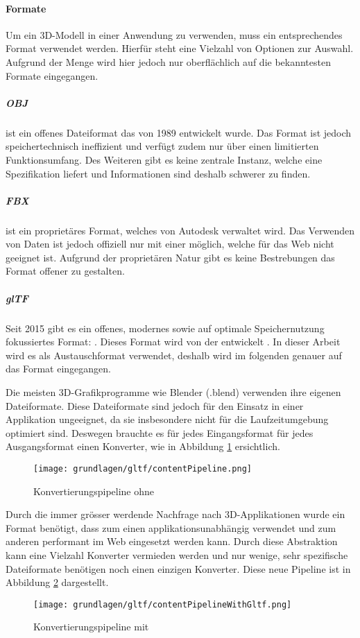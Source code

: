 \paragraph{Formate}
Um ein 3D-Modell in einer Anwendung zu verwenden, muss ein entsprechendes Format verwendet werden. Hierfür steht eine Vielzahl von Optionen zur Auswahl. Aufgrund der Menge wird hier jedoch nur oberflächlich auf die bekanntesten Formate eingegangen.

\subparagraph{OBJ}
 ist ein offenes Dateiformat das von  1989 entwickelt wurde. Das Format ist jedoch speichertechnisch ineffizient und verfügt zudem nur über einen limitierten Funktionsumfang. Des Weiteren gibt es keine zentrale Instanz, welche eine Spezifikation liefert und Informationen sind deshalb schwerer zu finden. \cite{objSpec}

\subparagraph{FBX}
 ist ein proprietäres Format, welches von Autodesk verwaltet wird. Das Verwenden von  Daten ist jedoch offiziell nur mit einer  möglich, welche für das Web nicht geeignet ist. Aufgrund der proprietären Natur gibt es keine Bestrebungen das Format offener zu gestalten.

\subparagraph{glTF}
Seit 2015 gibt es ein offenes, modernes sowie auf optimale Speichernutzung fokussiertes Format: . Dieses Format wird von der  entwickelt \cite{gltf1Spec}. In dieser Arbeit wird es als Austauschformat verwendet, deshalb wird im folgenden genauer auf das Format eingegangen.

Die meisten 3D-Grafikprogramme wie Blender (.blend) verwenden ihre eigenen Dateiformate. Diese Dateiformate sind jedoch für den Einsatz in einer Applikation ungeeignet, da sie insbesondere nicht für die Laufzeitumgebung optimiert sind. Deswegen brauchte es für jedes Eingangsformat für jedes Ausgangsformat einen Konverter, wie in Abbildung \ref{fig:contentPipelineWithoutGltf} ersichtlich.

\begin{figure}[H]
  \centering
  \texttt{[image: grundlagen/gltf/contentPipeline.png]}
  \caption{Konvertierungspipeline ohne  \cite{gltfTutorialIntro}}
  \label{fig:contentPipelineWithoutGltf}
\end{figure}

Durch die immer grösser werdende Nachfrage nach 3D-Applikationen wurde ein Format benötigt, dass zum einen applikationsunabhängig verwendet und zum anderen performant im Web eingesetzt werden kann.
Durch diese Abstraktion kann eine Vielzahl Konverter vermieden werden und nur wenige, sehr spezifische Dateiformate benötigen noch einen einzigen Konverter. Diese neue Pipeline ist in Abbildung \ref{fig:contentPipelineWithGltf} dargestellt. \cite{gltfTutorialIntro}
\begin{figure}[H]
  \centering
  \texttt{[image: grundlagen/gltf/contentPipelineWithGltf.png]}
  \caption{Konvertierungspipeline mit  \cite{gltfTutorialIntro}}
  \label{fig:contentPipelineWithGltf}
\end{figure}

